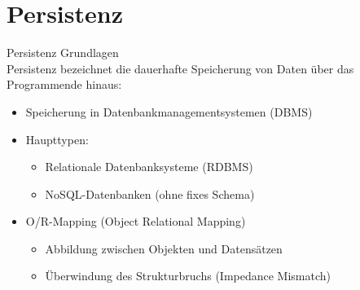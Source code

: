 \section{Persistenz}

\begin{concept}{Persistenz Grundlagen}\\
Persistenz bezeichnet die dauerhafte Speicherung von Daten über das Programmende hinaus:
\begin{itemize}
    \item Speicherung in Datenbankmanagementsystemen (DBMS)
    \item Haupttypen:
    \begin{itemize}
        \item Relationale Datenbanksysteme (RDBMS)
        \item NoSQL-Datenbanken (ohne fixes Schema)
    \end{itemize}
    \item O/R-Mapping (Object Relational Mapping)
    \begin{itemize}
        \item Abbildung zwischen Objekten und Datensätzen
        \item Überwindung des Strukturbruchs (Impedance Mismatch)
    \end{itemize}
\end{itemize}
\end{concept}

